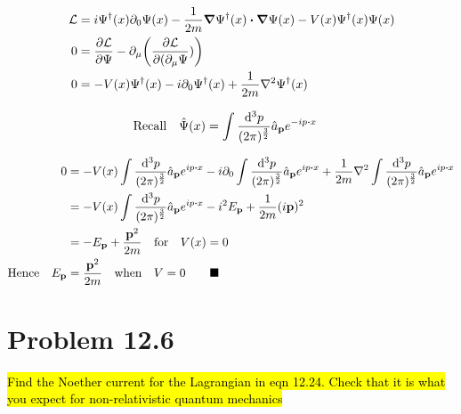 \documentclass{article}
\begin{document}
\begin{align*}
    \mathcal{L} & =i\Psi^\dagger(x)\partial_0\Psi(x)-\frac{1}{2m}\grad\Psi^\dagger(x)\vdot\grad\Psi(x)-V(x)\Psi^\dagger(x)\Psi(x) \\
    0           & =\pdv{\mathcal{L}}{\Psi}-\partial_\mu\pqty{\pdv{\mathcal{L}}{(\partial_\mu \Psi})}                              \\
    0           & =-V(x)\Psi^\dagger(x)-i\partial_0\Psi^\dagger(x)+\frac{1}{2m}\laplacian{\Psi^\dagger(x)}
\end{align*}

\begin{align*}
    \qq*{Recall}\hat{\Psi}(x) & =\int\frac{\dd[3]{p}}{(2\pi)^{\frac{3}{2}}}\hat{a}_{\vb{p}}e^{-ip\vdot x}
\end{align*}


\begin{align*}
    0                     & =-V(x)\int\frac{\dd[3]{p}}{(2\pi)^{\frac{3}{2}}}\hat{a}_{\vb{p}}e^{ip\vdot x}-i\partial_0\int\frac{\dd[3]{p}}{(2\pi)^{\frac{3}{2}}}\hat{a}_{\vb{p}}e^{ip\vdot x}+\frac{1}{2m}\laplacian{\int\frac{\dd[3]{p}}{(2\pi)^{\frac{3}{2}}}\hat{a}_{\vb{p}}e^{ip\vdot x}} \\
                          & =-V(x)\int\frac{\dd[3]{p}}{(2\pi)^{\frac{3}{2}}}\hat{a}_{\vb{p}}e^{ip\vdot x}-i^2 E_{\vb{p}}+\frac{1}{2m}(i\vb{p})^2                                                                                                                                             \\
                          & =-E_{\vb{p}}+\frac{\vb{p}^2}{2m}\qq{for}V(x)=0                                                                                                                                                                                                                   \\
    \qq*{Hence}E_{\vb{p}} & =\frac{\vb{p}^2}{2m}\qq{when}V=0\qquad\blacksquare
\end{align*}










\section*{Problem 12.6}
\begin{quoting}
    \hl{Find the Noether current for the Lagrangian in eqn 12.24. Check that it is what you expect for non-relativistic quantum mechanics}
\end{quoting}
\end{document}
